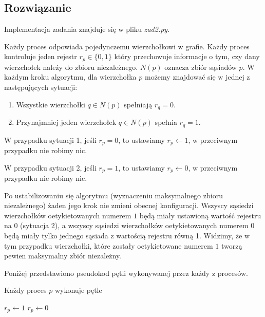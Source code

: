 \documentclass{article}
\newenvironment{pseudokod}[1][htb]{
	\renewcommand{\algorithmcfname}{}
	\begin{algorithm}[#1]%
	}{
\end{algorithm}
}
\begin{document}
    \subsection{Rozwiązanie}

    Implementacja zadania znajduje się w pliku \textit{zad2.py}.

    Każdy proces odpowiada pojedynczemu wierzchołkowi w grafie. Każdy proces kontroluje jeden rejestr $r_p \in \{0, 1\}$ który przechowuje 
    informacje o tym, czy dany wierzchołek należy do zbioru niezależnego. $N(p)$ oznacza zbiór sąsiadów $p$. 
    W każdym kroku algorytmu, dla wierzchołka $p$ możemy znajdować się w jednej z następujących sytuacji:
    \begin{enumerate}
        \item Wszystkie wierzchołki $q \in N(p)$ spełniają $r_q = 0$.
        \item Przynajmniej jeden wierzchołek $q \in N(p)$ spełnia $r_q = 1$.
    \end{enumerate}

    W przypadku sytuacji 1, jeśli $r_p = 0$, to ustawiamy $r_p \gets 1$, w przeciwnym przypadku nie robimy nic.

    W przypadku sytuacji 2, jeśli $r_p = 1$, to ustawiamy $r_p \gets 0$, w przeciwnym przypadku nie robimy nic.
    
    Po ustabilizowaniu się algorytmu (wyznaczeniu maksymalnego zbioru niezależnego) żaden jego krok nie zmieni obecnej konfiguracji. 
    Wszyscy sąsiedzi wierzchołków oetykietowanych numerem $1$ będą miały ustawioną wartość rejestru na 0 (sytuacja 2), a wszyscy sąsiedzi 
    wierzchołków oetykietowanych numerem $0$ będą miały tylko jednego sąsiada z wartością rejestru równą 1. Widzimy, że w tym przypadku 
    wierzchołki, które zostały oetykietowane numerem $1$ tworzą pewien maksymalny zbiór niezależny.

    Poniżej przedstawiono pseudokod pętli wykonywanej przez każdy z procesów.

    \begin{pseudokod}[H]
        \caption{Każdy proces $p$ wykonuje pętle}
         {
            \BlankLine
             {
                $r_p \gets 1$\;
            }
             {
                $r_p \gets 0$\;
            }
        }
    \end{pseudokod}
\end{document}
